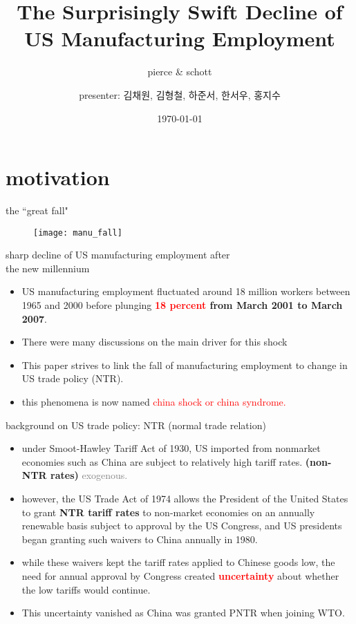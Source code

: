 \documentclass[10pt]{beamer}
\title{The Surprisingly Swift Decline of US Manufacturing Employment}
\subtitle{pierce \& schott}
\date{\today}
\author{presenter: 김채원, 김형철, 하준서, 한서우, 홍지수}
\institute{school of economics, yonsei university}
\begin{document}
\maketitle

\section{motivation}

\begin{frame}{the ``great fall"}
	\begin{figure}
		\texttt{[image: manu\_fall]}	
	\end{figure}

\end{frame}

\begin{frame}[fragile]{sharp decline of US manufacturing employment after \\the new millennium}

	\begin{itemize}
		\item US manufacturing employment fluctuated around 18 million workers between 1965 and 2000 before plunging \textbf{\textcolor{red}{18 percent} from March 2001 to March 2007}.
		\item There were many discussions on the main driver for this shock
		\item This paper strives to link the fall of manufacturing employment to change in US trade policy (NTR).
		\item this phenomena is now named \textcolor{red}{china shock or china syndrome.}
	\end{itemize}
\end{frame}

\begin{frame}[fragile]{background on US trade policy: NTR (normal trade relation)}
	\begin{itemize}
		\item under Smoot-Hawley Tariff Act of 1930, US imported from nonmarket economies such as China are subject to relatively high tariff rates. \textbf{(non-NTR rates)} \textcolor{gray}{exogenous.}
		\item however, the US Trade Act of 1974 allows the President of the United States to grant \textbf{NTR tariff rates} to non-market economies on an annually renewable basis subject to approval by the US Congress, and US presidents began granting such waivers to China annually in 1980. 
		\item while these waivers kept the tariff rates applied to Chinese goods low, the need for annual approval by Congress created \textbf{\textcolor{red}{uncertainty}} about whether the low tariffs would continue. 
		\item This uncertainty vanished as China was granted PNTR when joining WTO.
	\end{itemize}
\end{frame}
\end{document}
